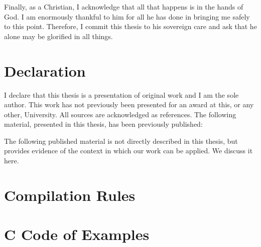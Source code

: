 \documentclass[a4paper,11pt,twoside,openright]{report}
\newif\ifShowChanges
\newif\ifFullModel
\newcommand{\IfFullModel}[1]{\ifFullModel #1 \fi}
\newcommand{\IfNotFullModel}[1]{\ifFullModel \else #1 \fi}
\begin{document}
Finally, as a Christian, I acknowledge that all that happens is in the
hands of God. 
I am enormously thankful to him for all he has done in bringing me
safely to this point. 
Therefore, I commit this thesis to his sovereign care and ask that he
alone may be glorified in all things.


\cleardoublepage
{}
{}
\chapter*{Declaration}

I declare that this thesis is a presentation of original work and I am
the sole author. 
This work has not previously been presented for an award at this, or
any other, University. 
All sources are acknowledged as references.
The following material, presented in this thesis, has been previously
published:

\begin{refsection}
  \raggedright
  \nocite{baxter2015a,baxter2017}
  \setlength{\bibitemsep}{0.5cm}
  \printbibliography[resetnumbers=true,heading=none]
\end{refsection}

The following published material is not directly described in this
thesis, but provides evidence of the context in which our work can be
applied. We discuss it here.

\begin{refsection}
  \raggedright
  \nocite{freitas2016}
  \setlength{\bibitemsep}{0.5cm}
  \printbibliography[resetnumbers=3,heading=none]
\end{refsection}

\begin{refsection}















\appendix

\FullModeltrue
\chapter{Compilation Rules}
\label{compilation-rules-appendix}



\chapter{C Code of Examples}
\label{example-c-code-appendix}



{\raggedright \printbibliography[resetnumbers=true]}
\end{refsection}

\ifShowChanges
\clearpage
\phantomsection
\addcontentsline{toc}{chapter}{Index of Changes}
\printindex[changes]
\fi
\end{document}
